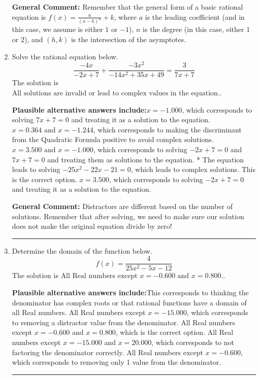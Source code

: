 \documentclass{extbook}[14pt]
\newcommand{\litem}[1]{\item #1

\rule{\textwidth}{0.4pt}}
\begin{document}
\begin{enumerate}
{\textbf{General Comment:} Remember that the general form of a basic rational equation is $ f(x) = \frac{a}{(x-h)^n} + k$, where $a$ is the leading coefficient (and in this case, we assume is either $1$ or $-1$), $n$ is the degree (in this case, either $1$ or $2$), and $(h, k)$ is the intersection of the asymptotes.
}
\litem{
Solve the rational equation below.
\[ \frac{-4x}{-2x + 7} + \frac{-3x^{2}}{-14x^{2} +35 x + 49} = \frac{3}{7x + 7} \]The solution is \( \text{All solutions are invalid or lead to complex values in the equation.} \).\begin{enumerate}[label=\Alph*.]
\textbf{Plausible alternative answers include:}$x = -1.000$, which corresponds to solving $7x + 7 = 0$ and treating it as a solution to the equation.
$x = 0.364 \text{ and } x = -1.244$, which corresponds to making the discriminant from the Quadratic Formula positive to avoid complex solutions.
$x = 3.500 \text{ and } x = -1.000$, which corresponds to solving $-2x + 7 = 0$ and $7x + 7 = 0$ and treating them as solutions to the equation.
* The equation leads to solving $-25x^{2} -22 x -21=0$, which leads to complex solutions. This is the correct option.
$x = 3.500$, which corresponds to solving $-2x + 7 = 0$ and treating it as a solution to the equation.
\end{enumerate}

\textbf{General Comment:} Distractors are different based on the number of solutions. Remember that after solving, we need to make sure our solution does not make the original equation divide by zero!
}
\litem{
Determine the domain of the function below.
\[ f(x) = \frac{4}{25x^{2} -5 x -12} \]The solution is \( \text{All Real numbers except } x = -0.600 \text{ and } x = 0.800. \).\begin{enumerate}[label=\Alph*.]
\textbf{Plausible alternative answers include:}This corresponds to thinking the denominator has complex roots or that rational functions have a domain of all Real numbers.
All Real numbers except $x = -15.000$, which corresponds to removing a distractor value from the denominator.
All Real numbers except $x = -0.600$ and $x = 0.800$, which is the correct option.
All Real numbers except $x = -15.000$ and $x = 20.000$, which corresponds to not factoring the denominator correctly.
All Real numbers except $x = -0.600$, which corresponds to removing only 1 value from the denominator.
\end{enumerate}

}
\end{enumerate}
\end{document}
